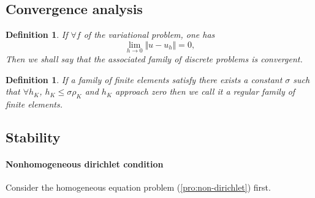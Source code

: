 \documentclass[11pt,letterpaper]{article}
\newtheorem{defn}[thm]{Definition}
\begin{document}
  \subsection{Convergence analysis}
\label{sec:convergence}
  \begin{defn}
    If $\forall f$ of the variational problem, one has
    \begin{displaymath}
      \lim_{h\rightarrow 0}\Vert u-u_h\Vert =0,
    \end{displaymath}
  Then we shall say that the associated family of discrete problems is convergent.
\end{defn}
\begin{defn}
  If a family of finite elements satisfy there exists a constant $\sigma$ such that
  $\forall h_K$, $h_K\leq \sigma \rho_K$ and $h_K$ approach zero then we call it
  \emph{a regular family of finite elements.}
\end{defn}

\subsection{Stability}
\label{sec:stability}

\paragraph{ Nonhomogeneous dirichlet  condition}

Consider the homogeneous equation problem (\ref{pro:non-dirichlet}) first.
\end{document}
